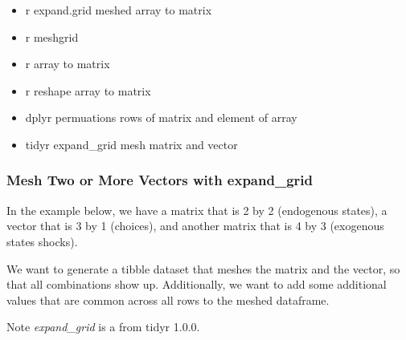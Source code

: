 \documentclass[
]{book}
\providecommand{\tightlist}{%
  \setlength{\itemsep}{0pt}\setlength{\parskip}{0pt}}
\begin{document}
\begin{itemize}
\tightlist
\item
  r expand.grid meshed array to matrix
\item
  r meshgrid
\item
  r array to matrix
\item
  r reshape array to matrix
\item
  dplyr permuations rows of matrix and element of array
\item
  tidyr expand\_grid mesh matrix and vector
\end{itemize}

\hypertarget{mesh-two-or-more-vectors-with-expand_grid}{%
\subsubsection{Mesh Two or More Vectors with expand\_grid}\label{mesh-two-or-more-vectors-with-expand_grid}}

In the example below, we have a matrix that is 2 by 2 (endogenous states), a vector that is 3 by 1 (choices), and another matrix that is 4 by 3 (exogenous states shocks).

We want to generate a tibble dataset that meshes the matrix and the vector, so that all combinations show up. Additionally, we want to add some additional values that are common across all rows to the meshed dataframe.

Note \emph{expand\_grid} is a from tidyr 1.0.0.
\end{document}
